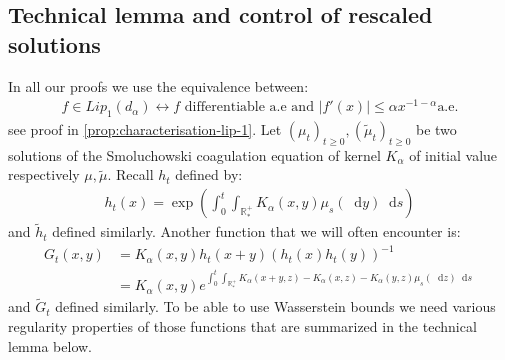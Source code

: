 \documentclass[11pt,a4paper]{article}
\newcommand{\RRP}{\mathbb{R}^+_*}
\newcommand{\Proc}[1]{\left(#1\right)_{t\geq 0}}
\newcommand{\dd}{\mathop{}\!\mathrm{d}}
\begin{document}
\subsection{Technical lemma and control of rescaled solutions}\label{section:wass-technical}
In all our proofs we use the equivalence between:
\begin{align*}
    f \in Lip_1(d_\alpha) \leftrightarrow f \text{ differentiable a.e and } |f'(x)| \leq \alpha x^{-1-\alpha} \text{a.e}.
\end{align*}
see proof in \ref{prop:characterisation-lip-1}. Let $\Proc{\mu_t}, \Proc{\tilde{\mu}_t}$ be two solutions of the Smoluchowski coagulation equation of kernel $K_\alpha$ of initial value respectively $\mu,\tilde{\mu}$. Recall $h_t$ defined by:
\begin{align*}
        h_t(x) = \exp\left(\int_0^t \int_{\RRP} K_\alpha(x,y) \mu_s(\dd y) \dd s \right) 
\end{align*}
and $\tilde{h}_t$ defined similarly. Another function that we will often encounter is:
\begin{align*}
        G_{t}(x,y) &= K_\alpha(x,y) h_t(x+y)\left( h_t(x)h_t(y)\right)^{-1}\\
         &=  K_\alpha(x,y) e^{\int_0^t \int_{\RRP} K_\alpha(x+y,z) - K_\alpha(x,z) -K_\alpha(y,z)\mu_s(\dd z) \dd s}\
\end{align*}
and $\tilde{G}_t$ defined similarly. To be able to use Wasserstein bounds we need various regularity properties of those functions that are summarized in the technical lemma below.
\end{document}
